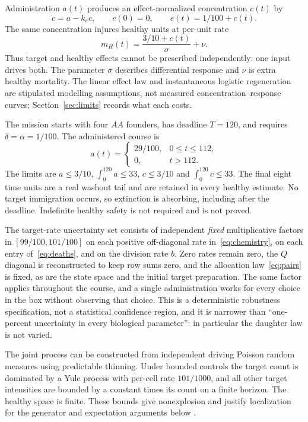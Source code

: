 Administration $a(t)$ produces an effect-normalized concentration $c(t)$ by
\begin{equation}\label{eq:pk}
 \dot c=a-k_ec,\qquad c(0)=0,\qquad
 e(t)=1/100+c(t).
\end{equation}
The same concentration injures healthy units at per-unit rate
\begin{equation}\label{eq:shared}
 m_H(t)=\frac{3/10+c(t)}{\sigma}+\nu.
\end{equation}
Thus target and healthy effects cannot be prescribed independently: one input drives both. The parameter $\sigma$ describes differential response and $\nu$ is extra healthy mortality. The linear effect law and instantaneous logistic regeneration are stipulated modelling assumptions, not measured concentration--response curves; Section~\ref{sec:limits} records what each costs.

The mission starts with four $AA$ founders, has deadline $T=120$, and requires $\delta=\alpha=1/100$. The administered course is
\begin{equation}\label{eq:course}
 a(t)=\begin{cases}29/100,&0\le t\le112,\\0,&t>112.\end{cases}
\end{equation}
The limits are $a\le3/10$, $\int_0^{120}a\le33$, $c\le3/10$ and $\int_0^{120}c\le33$. The final eight time units are a real washout tail and are retained in every healthy estimate. No target immigration occurs, so extinction is absorbing, including after the deadline. Indefinite healthy safety is not required and is not proved.

\begin{remark}\label{rem:box}
The target-rate uncertainty set consists of independent \emph{fixed} multiplicative factors in $[99/100,101/100]$ on each positive off-diagonal rate in~\eqref{eq:chemistry}, on each entry of~\eqref{eq:deaths}, and on the division rate $b$. Zero rates remain zero, the $Q$ diagonal is reconstructed to keep row sums zero, and the allocation law~\eqref{eq:pairs} is fixed, as are the state space and the initial target preparation. The same factor applies throughout the course, and a single administration works for every choice in the box without observing that choice. This is a deterministic robustness specification, not a statistical confidence region, and it is narrower than ``one-percent uncertainty in every biological parameter'': in particular the daughter law is not varied.
\end{remark}

The joint process can be constructed from independent driving Poisson random measures using predictable thinning. Under bounded controls the target count is dominated by a Yule process with per-cell rate $101/1000$, and all other target intensities are bounded by a constant times its count on a finite horizon. The healthy space is finite. These bounds give nonexplosion and justify localization for the generator and expectation arguments below \citep{ethierkurtz}.
